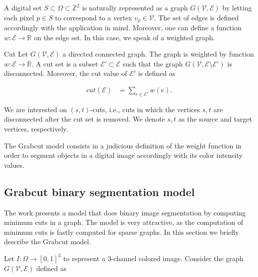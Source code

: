 A digital set $S \subset \Omega \subset \mathbb{Z}^2$ is naturally represented as a graph $G(\mathcal{V},\mathcal{E})$ by letting each pixel $p \in S$ to correspond to a vertex $v_p \in \mathcal{V}$. The set of edges is defined accordingly with the application in mind. Moreover, one can define a function $w:\mathcal{E}\rightarrow \mathbb{R}$ on the edge set. In this case, we speak of a weighted graph.

\begin{definition}{Cut}
Let $G(\mathcal{V},\mathcal{E})$ a directed connected graph. The graph is weighted  by function $w:\mathcal{E}\rightarrow \mathbb{R}$. A cut set is a subset $\mathcal{E}' \subset \mathcal{E}$ such that the graph $G(\mathcal{V},\mathcal{E} \setminus \mathcal{E}')$ is disconnected. Moreover, the cut value of $\mathcal{E}'$ is defined as

\begin{align*}
	cut(\mathcal{E}) &= \sum_{e \in \mathcal{E}'}{w(e)}.
\end{align*}
\end{definition}

We are interested on $(s,t)$-cuts, i.e., cuts in which the vertices $s,t$ are disconnected after the cut set is removed. We denote $s,t$ as the source and target vertices, respectively. 


The Grabcut model consists in a judicious definition of the weight function in order to segment objects in a digital image accordingly with its color intensity values.

\subsection{Grabcut binary segmentation model}
The work \cite{} presents a model that does binary image segmentation by computing minimum cuts in a graph. The model is very attractive, as the computation of minimum cuts is fastly computed for sparse graphs. In this section we briefly describe the Grabcut model.

Let $I:\Omega\rightarrow [0,1]^3$ to represent a $3$-channel colored image. Consider the graph $G(\mathcal{V},\mathcal{E})$ defined as

